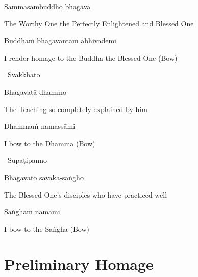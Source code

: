 \vspace{-0.5cm}

Sammāsambuddho bhagavā

\begin{english}
  The Worthy One the Perfectly Enlightened and Blessed One
\end{english}

Buddhaṁ bhagavantaṁ abhivādemi\relax

\begin{english}
  I render homage to the Buddha the Blessed One \hfill{(Bow)}
\end{english}

\begin{leader}
  \anglebracketleft\ \hspace{-0.5mm}Svākkhāto \hspace{-0.5mm}\anglebracketright\
\end{leader}

\vspace{-0.5cm}

Bhagavatā dhammo

\begin{english}
  The Teaching so completely explained by him
\end{english}

Dhammaṁ namassāmi\relax

\begin{english}
  I bow to the Dhamma \hfill{(Bow)}
\end{english}

\begin{leader}
  \anglebracketleft\ \hspace{-0.5mm}Supaṭipanno \hspace{-0.5mm}\anglebracketright\
\end{leader}

\vspace{-0.5cm}

Bhagavato sāvaka-saṅgho

\begin{english}
  The Blessed One's disciples who have practiced well
\end{english}

Saṅghaṁ namāmi

\begin{english}
  I bow to the Saṅgha \hfill{(Bow)}
\end{english}

\suttaRef{[Trad]}

\section{Preliminary Homage}
\label{preliminary-homage}

